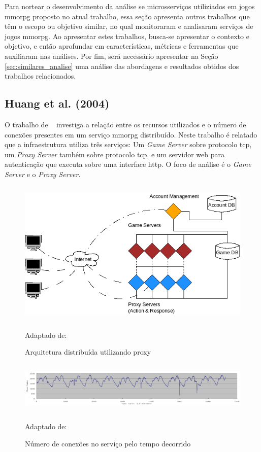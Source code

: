 Para nortear o desenvolvimento da análise se microsserviços utiliziados em jogos \ac{mmorpg} proposto no atual trabalho, essa seção apresenta outros trabalhos que têm o escopo ou objetivo similar, no qual monitoraram e analisaram serviços de jogos \ac{mmorpg}.
%
Ao apresentar estes trabalhos, busca-se apresentar o contexto e objetivo, e então aprofundar em características, métricas e ferramentas que auxiliaram nas análises.
%
Por fim, será necessário apresentar na Seção \ref{sec:similares_analise} uma análise das abordagens e resultados obtidos dos trabalhos relacionados.



\subsection{Huang et al. (2004)}



O trabalho de ~\cite{1417630} investiga a relação entre os recursos utilizados e o número de conexões presentes em um serviço \ac{mmorpg} distribuído.
%
Neste trabalho é relatado que a infraestrutura utiliza três serviços: Um \textit{Game Server} sobre protocolo \ac{tcp}, um \textit{Proxy Server} também sobre protocolo \ac{tcp}, e um servidor web para autenticação que executa sobre uma interface \ac{http}.
%
O foco de análise é o \textit{Game Server} e o \textit{Proxy Server}.



\begin{figure}[htb!]
\caption{Arquitetura distribuída utilizando proxy}
\label{fig:game_with_proxy}
\includegraphics[height=7cm]{img/cap2/game_with_proxy.png}
\centering

Adaptado de:~\cite{1417630}
\end{figure}



\begin{figure}[htb!]
\caption{Número de conexões no serviço pelo tempo decorrido}
\label{fig:players_peer_time}
\includegraphics[height=2.5cm]{img/cap2/players_peer_time.png}
\centering

Adaptado de:~\cite{1417630}
\end{figure}




